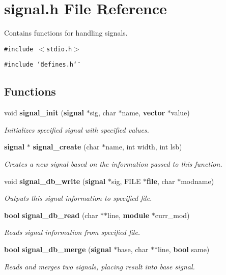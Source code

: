 \section{signal.h File Reference}
\label{signal_8h}
Contains functions for handling signals.  


{\tt \#include $<$stdio.h$>$}\par
{\tt \#include \char`\"{}defines.h\char`\"{}}\par
\subsection*{Functions}
\begin{CompactItemize}
\item 
void {\bf signal\_\-init} ({\bf signal} $\ast$sig, char $\ast$name, {\bf vector} $\ast$value)
\begin{CompactList}\small\item\em Initializes specified signal with specified values. \item\end{CompactList}\item 
{\bf signal} $\ast$ {\bf signal\_\-create} (char $\ast$name, int width, int lsb)
\begin{CompactList}\small\item\em Creates a new signal based on the information passed to this function. \item\end{CompactList}\item 
void {\bf signal\_\-db\_\-write} ({\bf signal} $\ast$sig, FILE $\ast${\bf file}, char $\ast$modname)
\begin{CompactList}\small\item\em Outputs this signal information to specified file. \item\end{CompactList}\item 
{\bf bool} {\bf signal\_\-db\_\-read} (char $\ast$$\ast$line, {\bf module} $\ast$curr\_\-mod)
\begin{CompactList}\small\item\em Reads signal information from specified file. \item\end{CompactList}\item 
{\bf bool} {\bf signal\_\-db\_\-merge} ({\bf signal} $\ast$base, char $\ast$$\ast$line, {\bf bool} same)
\begin{CompactList}\small\item\em Reads and merges two signals, placing result into base signal. \item\end{CompactList}\item 

\end{CompactItemize}

